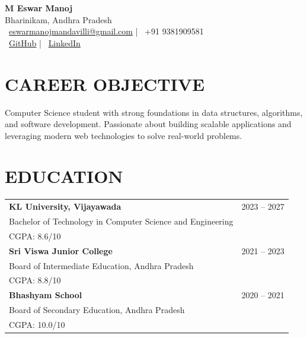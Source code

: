 \documentclass[a4paper,12pt]{article}
\begin{document}
\begin{center}
    {\fontsize{24}{26}\selectfont \textbf{M Eswar Manoj}} \\[6pt]
    
    {\large Bharinikam, Andhra Pradesh} \\[8pt]

    {\large
    \faEnvelope\ \href{mailto:eswarmanojmandavilli@gmail.com}{eswarmanojmandavilli@gmail.com}
    \hspace{0.6cm} | \hspace{0.6cm}
    \faPhone\ +91 9381909581
    } \\[5pt]

    {\large
    \faGithub\ \href{https://github.com/eswar-20}{GitHub}
    \hspace{0.8cm} | \hspace{0.8cm}
    \faLinkedin\ \href{https://www.linkedin.com/in/eswar-manoj-mandavilli-2a8456350}{LinkedIn}
    }
\end{center}

\vspace{-8pt}

\section*{CAREER OBJECTIVE}
Computer Science student with strong foundations in data structures, algorithms, and software development. Passionate about building scalable applications and leveraging modern web technologies to solve real-world problems.

\section*{EDUCATION}

\begin{tabularx}{\textwidth}{Xr}
\textbf{KL University, Vijayawada} & 2023 -- 2027 \\
Bachelor of Technology in Computer Science and Engineering & \\
CGPA: 8.6/10 & \\[5pt]

\textbf{Sri Viswa Junior College} & 2021 -- 2023 \\
Board of Intermediate Education, Andhra Pradesh & \\
CGPA: 8.8/10 & \\[5pt]

\textbf{Bhashyam School} & 2020 -- 2021 \\
Board of Secondary Education, Andhra Pradesh & \\
CGPA: 10.0/10 & \\
\end{tabularx}
\end{document}
